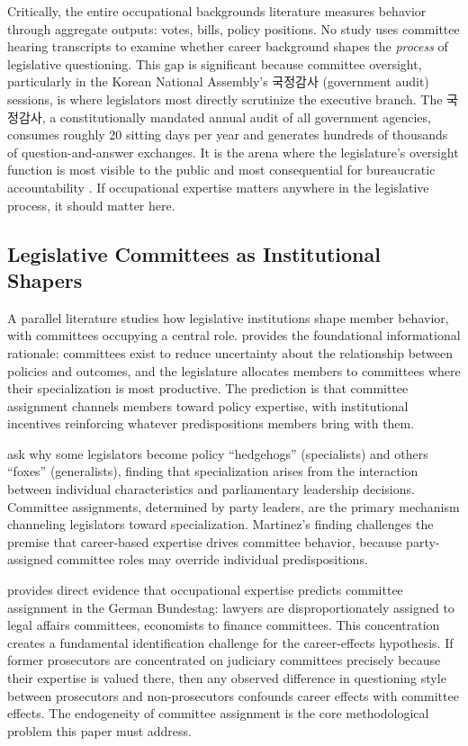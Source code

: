 \documentclass[11pt]{article}
\begin{document}
Critically, the entire occupational backgrounds literature measures behavior through aggregate outputs: votes, bills, policy positions. No study uses committee hearing transcripts to examine whether career background shapes the \textit{process} of legislative questioning. This gap is significant because committee oversight, particularly in the Korean National Assembly's 국정감사 (government audit) sessions, is where legislators most directly scrutinize the executive branch. The 국정감사, a constitutionally mandated annual audit of all government agencies, consumes roughly 20 sitting days per year and generates hundreds of thousands of question-and-answer exchanges. It is the arena where the legislature's oversight function is most visible to the public and most consequential for bureaucratic accountability \citep{ban2025}. If occupational expertise matters anywhere in the legislative process, it should matter here.

\subsection{Legislative Committees as Institutional Shapers}

A parallel literature studies how legislative institutions shape member behavior, with committees occupying a central role. \citet{krehbiel1991} provides the foundational informational rationale: committees exist to reduce uncertainty about the relationship between policies and outcomes, and the legislature allocates members to committees where their specialization is most productive. The prediction is that committee assignment channels members toward policy expertise, with institutional incentives reinforcing whatever predispositions members bring with them.

\citet{martinez2022} ask why some legislators become policy ``hedgehogs'' (specialists) and others ``foxes'' (generalists), finding that specialization arises from the interaction between individual characteristics and parliamentary leadership decisions. Committee assignments, determined by party leaders, are the primary mechanism channeling legislators toward specialization. Martinez's finding challenges the premise that career-based expertise drives committee behavior, because party-assigned committee roles may override individual predispositions.

\citet{mickler2017} provides direct evidence that occupational expertise predicts committee assignment in the German Bundestag: lawyers are disproportionately assigned to legal affairs committees, economists to finance committees. This concentration creates a fundamental identification challenge for the career-effects hypothesis. If former prosecutors are concentrated on judiciary committees precisely because their expertise is valued there, then any observed difference in questioning style between prosecutors and non-prosecutors confounds career effects with committee effects. The endogeneity of committee assignment is the core methodological problem this paper must address.
\end{document}
